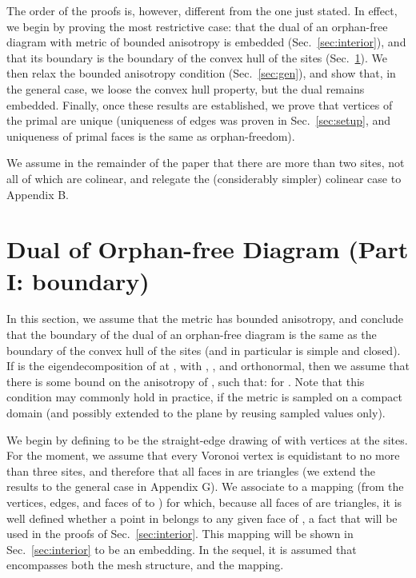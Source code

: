 \documentclass[11pt]{article}
\begin{document}
The order of the proofs is, however, different from the one just stated. In effect, we begin by proving the most restrictive case: that the dual of an orphan-free diagram with metric of bounded anisotropy is embedded (Sec.~\ref{sec:interior}), 
and that its boundary is the boundary of the convex hull of the sites (Sec.~\ref{sec:boundary}). We then relax the bounded anisotropy condition (Sec.~\ref{sec:gen}), and show that, in the general case, we loose the convex hull property, but the dual remains embedded. 
Finally, once these results are established, we prove that vertices of the primal are unique (uniqueness of edges was proven in Sec.~\ref{sec:setup}, and uniqueness of primal faces is the same as orphan-freedom). 

We assume in the remainder of the paper that there are more than two sites, not all of which are colinear, and relegate the (considerably simpler) colinear case to Appendix B. 











\section{Dual of Orphan-free Diagram (Part I: boundary)}\label{sec:boundary}

In this section, we assume that the metric has bounded anisotropy, and conclude that the boundary of the dual of an orphan-free diagram is the same as the boundary of the convex hull of the sites (and in particular is simple and closed). 
If  is the eigendecomposition of  at , with , , and  orthonormal, then we assume that there is some bound  on the anisotropy of , such that:  for . 
Note that this condition may commonly hold in practice, if the metric is sampled on a compact domain (and possibly extended to the plane by reusing sampled values only). 



We begin by defining  to be the straight-edge drawing of  with vertices at the sites. For the moment, we assume that every Voronoi vertex is equidistant to no more than three sites, and therefore that all faces in  are triangles 
(we extend the results to the general case in Appendix G). We associate to  a mapping (from the vertices, edges, and faces
of  to ) for which, because all faces of  are triangles, it is well defined whether a point in
 belongs to any given face of , a fact that will be
used in the proofs of Sec.~\ref{sec:interior}. 
This mapping will be shown in Sec.~\ref{sec:interior} to be an embedding. 
In the sequel, it is assumed that  encompasses both the mesh
structure, and the mapping. 
\end{document}
